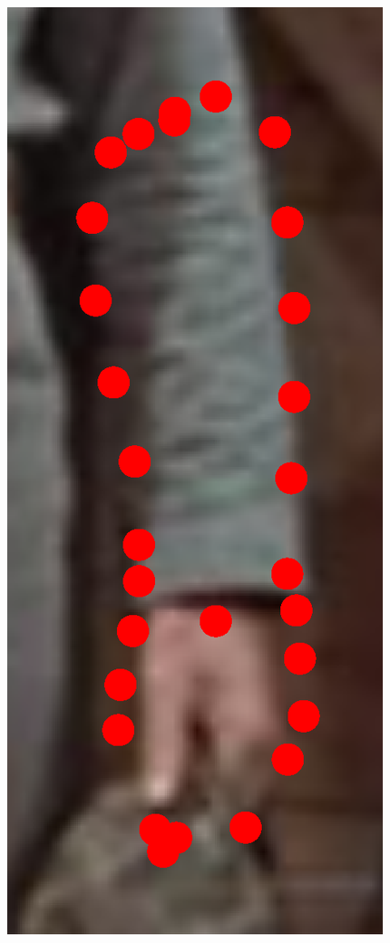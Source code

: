 \begin{figure}[!t]
    \includegraphics[height=\ofh]{resources/Annotation_Correction/Fittings/7.eps}
    \hfill

\end{figure}

